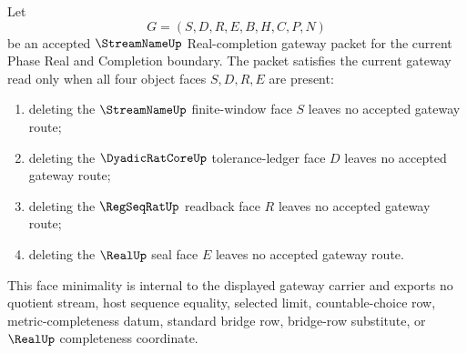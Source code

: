 \begin{theorem}
\label{thm:streamname-real-completion-gateway-face-minimality}
Let
$$
G=(S,D,R,E,B,H,C,P,N)
$$
be an accepted $\StreamNameUp$ Real-completion gateway packet for the current Phase Real and Completion boundary. The packet satisfies the current gateway read only when all four object faces $S,D,R,E$ are present:
\begin{enumerate}
\item deleting the $\StreamNameUp$ finite-window face $S$ leaves no accepted gateway route;
\item deleting the $\DyadicRatCoreUp$ tolerance-ledger face $D$ leaves no accepted gateway route;
\item deleting the $\RegSeqRatUp$ readback face $R$ leaves no accepted gateway route;
\item deleting the $\RealUp$ seal face $E$ leaves no accepted gateway route.
\end{enumerate}
This face minimality is internal to the displayed gateway carrier and exports no quotient stream, host sequence equality, selected limit, countable-choice row, metric-completeness datum, standard bridge row, bridge-row substitute, or $\RealUp$ completeness coordinate.
\end{theorem}

